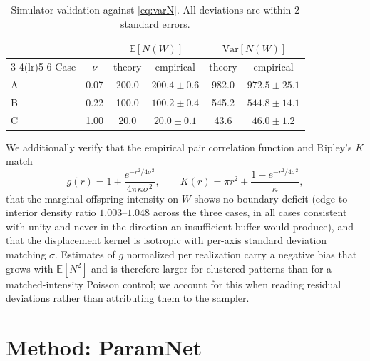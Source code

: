 \documentclass[11pt,letterpaper]{article}
\newcommand{\1}{\mathds{1}}
\theoremstyle{plain}
\theoremstyle{definitioncolon}
\begin{document}
\begin{table}[tbp]
\centering
\begin{tabular}{lccccc}
\toprule
 & & \multicolumn{2}{c}{$\mathbb{E}[N(W)]$} & \multicolumn{2}{c}{$\mathrm{Var}[N(W)]$} \\
\cmidrule(lr){3-4}\cmidrule(lr){5-6}
Case & $\nu$ & theory & empirical & theory & empirical \\
\midrule
A & 0.07 & 200.0 & $200.4 \pm 0.6$ & 982.0 & $972.5 \pm 25.1$ \\
B & 0.22 & 100.0 & $100.2 \pm 0.4$ & 545.2 & $544.8 \pm 14.1$ \\
C & 1.00 & 20.0  & $20.0 \pm 0.1$  & 43.6  & $46.0 \pm 1.2$ \\
\bottomrule
\end{tabular}
\caption{Simulator validation against \eqref{eq:varN}. All deviations are within
$2$ standard errors.}
\label{tab:sim-validation}
\end{table}

We additionally verify that the empirical pair correlation function and Ripley's
$K$ match
    \[
    g(r) = 1 + \frac{e^{-r^2/4\sigma^2}}{4\pi\kappa\sigma^2},
    \qquad
    K(r) = \pi r^2 + \frac{1 - e^{-r^2/4\sigma^2}}{\kappa},
    \]
that the marginal offspring intensity on $W$ shows no boundary deficit
(edge-to-interior density ratio $1.003$--$1.048$ across the three cases, in all
cases consistent with unity and never in the direction an insufficient buffer
would produce), and that the displacement kernel is isotropic with per-axis
standard deviation matching $\sigma$. Estimates of $g$ normalized per realization
carry a negative bias that grows with $\mathbb{E}[N^2]$ and is therefore larger
for clustered patterns than for a matched-intensity Poisson control; we account
for this when reading residual deviations rather than attributing them to the
sampler.


\section{Method: ParamNet}
\label{sec:method}
\end{document}
